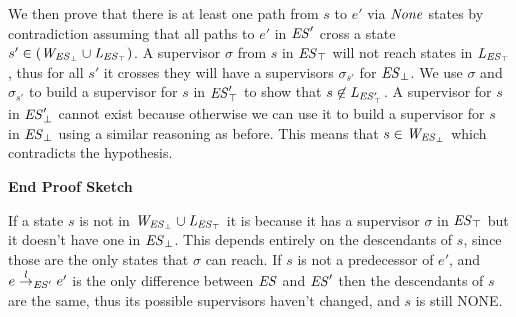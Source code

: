 We then prove that there is at least one path from $s$ to $e'$ via $\mathit{None}$ states by 
contradiction assuming that all paths to $e'$ in $\mathit{ES}'$ cross a state $s' \in 
(\mathit{W_{\mathit{\mathit{ES}_{\bot}}}} \cup \mathit{L_{\mathit{\mathit{ES}_{\top}}}})$. A supervisor $\sigma$ from $s$ in 
$\mathit{\mathit{ES}_{\top}}$ will not reach states in $\mathit{L_{\mathit{\mathit{ES}_{\top}}}}$, 
thus for all $s'$ it crosses they will have a supervisors $\sigma_{s'}$ for 
$\mathit{\mathit{ES}_{\bot}}$. We use $\sigma$ and $\sigma_{s'}$  to 
build a supervisor for $s$ in $\mathit{\mathit{ES}'_{\top}}$ to show that $s 
\not\in \mathit{L_{\mathit{\mathit{ES}'_{\top}}}}$.
A supervisor for $s$ in $\mathit{\mathit{ES}'_{\bot}}$ cannot exist because 
otherwise we can use it to build a supervisor for $s$ in 
$\mathit{\mathit{ES}_{\bot}}$ using a similar reasoning as before. This means 
that $s \in 
\mathit{W_{\mathit{\mathit{ES}_{\bot}}}}$ which contradicts the hypothesis. 






%
%
%
%

\textbf{{End Proof Sketch}}

If a state $s$ is not in $\mathit{W_{\mathit{\mathit{ES}_{\bot}}}} \cup \mathit{L_{\mathit{\mathit{ES}_{\top}}}}$ it is because it has a  supervisor $\sigma$ in $\mathit{\mathit{ES}_{\top}}$ but it doesn't have one in $\mathit{\mathit{ES}_{\bot}}$. This depends entirely on the descendants of $s$, since those are the only states that $\sigma$ can reach. If $s$ is not a predecessor of $e'$, and $e \overset{l}{\rightarrow}_{\mathit{ES}'} e'$ is the only difference between $\mathit{ES}$ and $\mathit{ES}'$ then the descendants of $s$ are the same, thus its possible supervisors haven't changed, and $s$ is still NONE.

